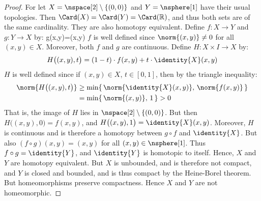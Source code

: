 \documentclass{book}                                                           %
\begin{document}
                \begin{proof}
                    For let $X=\nspace[2]\setminus\{(0,0)\}$ and
                    $Y=\nsphere[1]$ have their usual topologies. Then
                    $\Card(X)=\Card(Y)=\Card(\mathbb{R})$, and thus both sets
                    are of the same cardinality. They are also homotopy
                    equivalent. Define $f:X\rightarrow{Y}$ and
                    $g:Y\rightarrow{X}$ by:
                                {g(x,y)=(x,y)}
                    $f$ is well defined since $\norm{(x,y)}\ne{0}$ for all
                    $(x,y)\in{X}$. Moreover, both $f$ and $g$ are continuous.
                    Define $H:X\times{I}\rightarrow{X}$ by:
                    \begin{equation}
                        H\big((x,y),t\big)
                        =(1-t)\cdot{f}(x,y)+t\cdot\identity{X}(x,y)
                    \end{equation}
                    $H$ is well defined since if $(x,y)\in{X}$, $t\in[0,1]$,
                    then by the triangle inequality:
                    \begin{subequations}
                        \begin{align}
                            \norm{H\big((x,y),t\big)}
                            &\geq\min\{\,\norm{\identity{X}(x,y)},\,
                                \norm{f(x,y)}\,\}\\
                            &=\min\{\,\norm{(x,y)},\,1\,\}
                            >0
                        \end{align}
                    \end{subequations}
                    That is, the image of $H$ lies in
                    $\nspace[2]\setminus\{(0,0)\}$. But then
                    $H\big((x,y),0\big)=f(x,y)$, and
                    $H\big((x,y),1\big)=\identity{X}(x,y)$. Moreover, $H$ is
                    continuous and is therefore a homotopy between ${g}\circ{f}$
                    and $\identity{X}$. But also $({f}\circ{g})(x,y)=(x,y)$ for
                    all $(x,y)\in\nsphere[1]$. Thus ${f}\circ{g}=\identity{Y}$,
                    and $\identity{Y}$ is homotopic to itself. Hence, $X$ and
                    $Y$ are homotopy equivalent. But $X$ is unbounded, and is
                    therefore not compact, and $Y$ is closed and bounded, and is
                    thus compact by the Heine-Borel theorem. But homeomorphisms
                    preserve compactness. Hence $X$ and $Y$ are not
                    homeomorphic.
                \end{proof}
\end{document}
